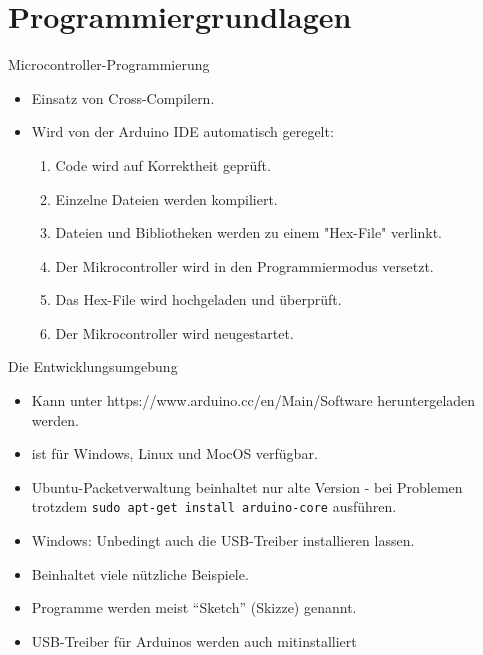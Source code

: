 \documentclass[12pt]{beamer}
\begin{document}
\section{Programmiergrundlagen}

\begin{frame}{Microcontroller-Programmierung}
\begin{itemize}
\item Einsatz von Cross-Compilern.
\item Wird von der Arduino IDE automatisch geregelt:
\begin{enumerate}
  \item Code wird auf Korrektheit geprüft.
  \item Einzelne Dateien werden kompiliert.
  \item Dateien und Bibliotheken werden zu einem "Hex-File" verlinkt.
  \item Der Mikrocontroller wird in den Programmiermodus versetzt.
  \item Das Hex-File wird hochgeladen und überprüft.
  \item Der Mikrocontroller wird neugestartet.
\end{enumerate}
\end{itemize}
\end{frame}


\begin{frame}{Die Entwicklungsumgebung}
\begin{itemize}
\item Kann unter https://www.arduino.cc/en/Main/Software heruntergeladen werden.
\item ist für Windows, Linux und MocOS verfügbar.
\item Ubuntu-Packetverwaltung beinhaltet nur alte Version - bei Problemen trotzdem \texttt{sudo apt-get install arduino-core} ausführen.
\item Windows: Unbedingt auch die USB-Treiber installieren lassen.
\item Beinhaltet viele nützliche Beispiele.
\item Programme werden meist “Sketch” (Skizze) genannt.
\item USB-Treiber für Arduinos werden auch mitinstalliert
\end{itemize}
\end{frame}
\end{document}
